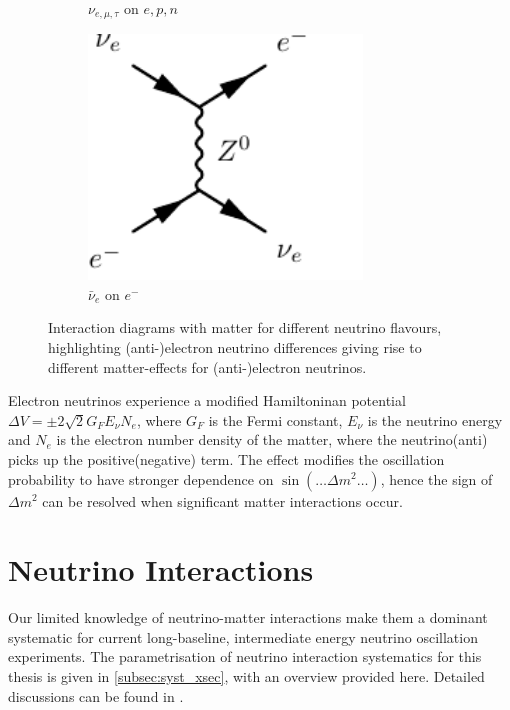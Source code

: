 \begin{figure}[h]
\begin{subfigure}[t]{0.32\textwidth}
		\caption{$\nu_{e,\mu,\tau}$ on $e,p,n$}
	\end{subfigure}
	\begin{subfigure}[t]{0.32\textwidth}
		\includegraphics[width=0.8\textwidth, clip,page=2]{figures/theory/feynmp_crop}
		\caption{$\bar{\nu}_e$ on $e^-$}
	\end{subfigure}
	\caption{Interaction diagrams with matter for different neutrino flavours, highlighting (anti-)electron neutrino differences giving rise to different matter-effects for (anti-)electron neutrinos.}
	\label{fig:msw_effect}
\end{figure}

Electron neutrinos experience a modified Hamiltoninan potential $\Delta V = \pm 2\sqrt{2}G_F E_\nu N_e$, where $G_F$ is the Fermi constant, $E_\nu$ is the neutrino energy and $N_e$ is the electron number density of the matter, where the neutrino(anti) picks up the positive(negative) term. The effect modifies the oscillation probability to have stronger dependence on $\sin \left(\ldots \Delta m^2 \ldots \right)$, hence the sign of $\Delta m^2$ can be resolved when significant matter interactions occur\cite{msw_summary}.

\section{Neutrino Interactions}
\label{sec:theory:int}
Our limited knowledge of neutrino-matter interactions make them a dominant systematic for current long-baseline, intermediate energy neutrino oscillation experiments. The parametrisation of neutrino interaction systematics for this thesis is given in \autoref{subsec:syst_xsec}, with an overview provided here. Detailed discussions can be found in \cite{katori_martini,ulrich_review,nieves_review}.

